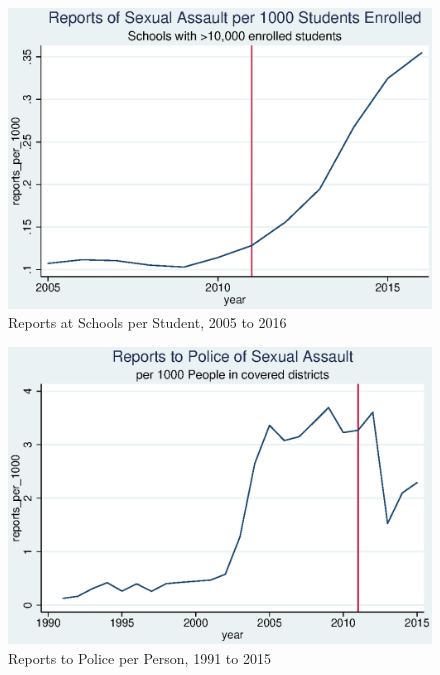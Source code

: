 \documentclass[AER,draftmode]{AEA}
\begin{document}



\clearpage
\appendix


\begin{figure}

\includegraphics[]{figures/school_reports.eps}

\caption{Reports at Schools per Student, 2005 to 2016}
\end{figure}

\begin{figure}

\includegraphics[]{figures/police_yearly_reports.eps}

\caption{Reports to Police per Person, 1991 to 2015}
\end{figure}
\end{document}
